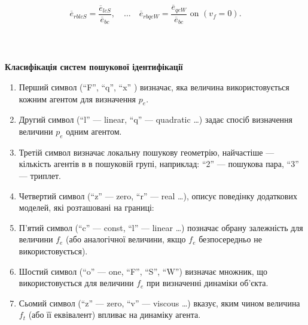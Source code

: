 \documentclass[14pt,handout,utf8]{beamer}
\newcommand{\Xhead}[1]{
 \begin{center}%
      \textbf{#1}%
 \end{center}%
}
\begin{document}
\begin{frame}
\begin{equation}
  \overline{e}_{rblcS} = \frac{\overline{e}_{lcS}}{\overline{e}_{bc}},
  \quad \ldots \quad
  \overline{e}_{rbqeW} = \frac{\overline{e}_{qeW}}{\overline{e}_{bc}} \text{ on }  (v_f=0) .
  \label{atu:eq:e_rbxx}
\end{equation}


\end{frame}



\begin{frame}
  \frametitle{~}

  \Xhead{Класифікація систем пошукової ідентифікації}

  \begin{enumerate}

    \item
      Перший символ (``F'', ``q'', ``x'' ) визначає,
      яка величина використовується кожним агентом для визначення $p_e$.

    \item
      Другий символ (``l'' --- linear, ``q'' --- quadratic \ldots ) 
      задає спосіб визначення величини $p_e$ одним агентом.

    \item
      Третій символ визначає локальну пошукову геометрію, найчастіше --- кількість
      агентів в в пошуковій групі, наприклад: ``2'' --- пошукова пара, ``3'' --- триплет.

    \item
      Четвертий символ (``z'' --- zero, ``r'' --- real \ldots),
      описує поведінку додаткових моделей, які розташовані на границі:

    \item
      П'ятий символ (``c'' --- const, ``l'' --- linear \ldots )
      позначає обрану залежність для величини $f_e$ (або
      аналогічної величини, якщо $f_e$ безпосередньо не використовується).

    \item
      Шостий символ (``o'' --- one, ``F'', ``S'', ``W'') визначає множник,
      що використовується для величини $f_e$ при визначенні динаміки об'єкта.

    \item
      Сьомий символ (``z'' --- zero, ``v'' --- viscous \ldots)
      вказує, яким чином величина $f_t$ (або її еквівалент) впливає на динаміку агента.


\end{enumerate}
\end{frame}
\end{document}
